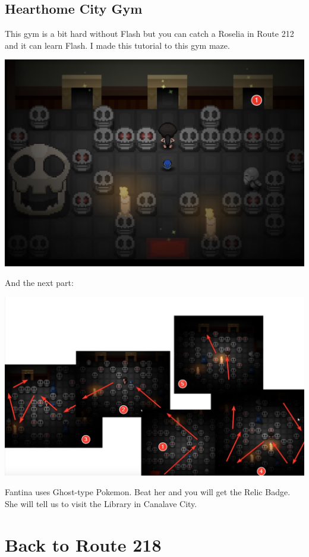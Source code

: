 \documentclass[11pt]{article}
\begin{document}
\subsection{Hearthome City Gym}\label{subsec:hearthome-city-gym}
This gym is a bit hard without Flash but you can catch a Roselia in Route 212
and it can learn Flash.
I made this tutorial to this gym maze.

\includegraphics[width=\textwidth]{walkthrough/Sinnoh/hearthome_gym_1}

And the next part:

\includegraphics[width=\textwidth]{walkthrough/Sinnoh/hearthome_gym_2}

Fantina uses Ghost-type Pokemon.
Beat her and you will get the Relic Badge.
She will tell us to visit the Library in Canalave City.

\section{Back to Route 218}\label{sec:back-to-route-218}
\end{document}
